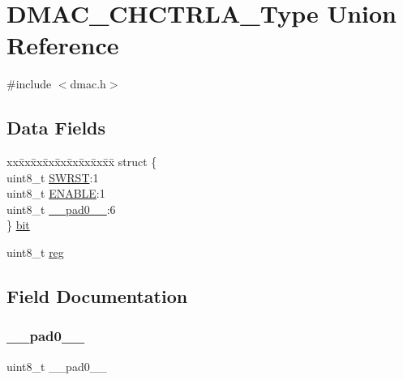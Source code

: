 \hypertarget{union_d_m_a_c___c_h_c_t_r_l_a___type}{}\section{D\+M\+A\+C\+\_\+\+C\+H\+C\+T\+R\+L\+A\+\_\+\+Type Union Reference}
\label{union_d_m_a_c___c_h_c_t_r_l_a___type}


{\ttfamily \#include $<$dmac.\+h$>$}

\subsection*{Data Fields}
\begin{DoxyCompactItemize}
\item 
\begin{tabbing}
xx\=xx\=xx\=xx\=xx\=xx\=xx\=xx\=xx\=\kill
struct \{\\
\>uint8\_t \mbox{\hyperlink{union_d_m_a_c___c_h_c_t_r_l_a___type_a9334d5ac0548802c90a8129c52c8e490}{SWRST}}:1\\
\>uint8\_t \mbox{\hyperlink{union_d_m_a_c___c_h_c_t_r_l_a___type_a2b3662f1b123463ae1a23c1f324e5cc5}{ENABLE}}:1\\
\>uint8\_t \mbox{\hyperlink{union_d_m_a_c___c_h_c_t_r_l_a___type_a8b4eebe79ded0459acec2f4950102ba3}{\_\_pad0\_\_}}:6\\
\} \mbox{\hyperlink{union_d_m_a_c___c_h_c_t_r_l_a___type_a49587fcdedac14d587133ec84303702b}{bit}}\\

\end{tabbing}\item 
uint8\+\_\+t \mbox{\hyperlink{union_d_m_a_c___c_h_c_t_r_l_a___type_a9428adc9af4653a2050e2536b55dec8d}{reg}}
\end{DoxyCompactItemize}


\subsection{Field Documentation}
\mbox{\label{union_d_m_a_c___c_h_c_t_r_l_a___type_a8b4eebe79ded0459acec2f4950102ba3}} 
\subsubsection{\texorpdfstring{\_\_pad0\_\_}{\_\_pad0\_\_}}
{\footnotesize\ttfamily uint8\+\_\+t \+\_\+\+\_\+pad0\+\_\+\+\_\+}

